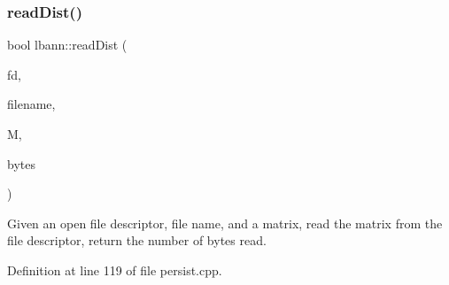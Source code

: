 \subsubsection{\texorpdfstring{read\+Dist()}{readDist()}}
{\footnotesize\ttfamily bool lbann\+::read\+Dist (\begin{DoxyParamCaption}\item[{int}]{fd,  }\item[{const char $\ast$}]{filename,  }\item[{\hyperlink{base_8hpp_a0fab5387556805cfeac3e7e567bf66c5}{Dist\+Mat} \&}]{M,  }\item[{uint64\+\_\+t $\ast$}]{bytes }\end{DoxyParamCaption})}



Given an open file descriptor, file name, and a matrix, read the matrix from the file descriptor, return the number of bytes read. 



Definition at line 119 of file persist.\+cpp.


